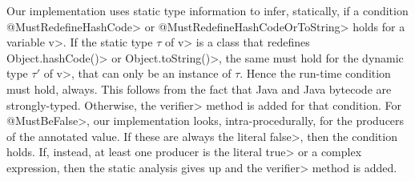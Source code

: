 Our implementation uses static type information to infer, statically, if a condition
\<@MustRedefineHashCode> or \<@MustRedefineHashCodeOrToString> holds for a variable \<v>.
If the static type
$\tau$ of \<v> is a class that redefines \<Object.hashCode()> or \<Object.toString()>,
the same must hold for the dynamic type $\tau'$ of \<v>, that can only be an
instance of $\tau$. Hence the run-time condition must hold, always.
This follows from the fact that Java and Java bytecode
are strongly-typed. Otherwise, the \<verifier> method is added for that condition.
For \<@MustBeFalse>, our implementation looks, intra-procedurally, for
the producers of the annotated value.
If these are always the literal \<false>, then the condition holds.
If, instead, at least one producer is the literal \<true> or a complex expression,
then the static analysis gives up and the \<verifier> method is added.
